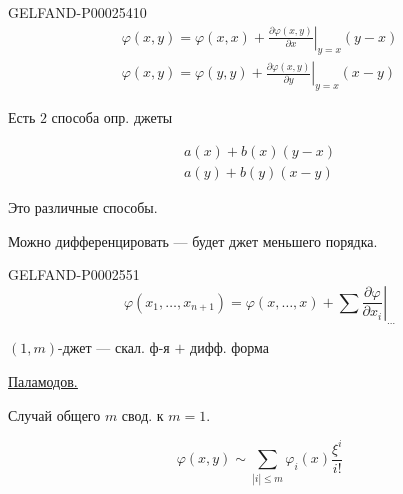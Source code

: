 \begin{GelfandAdjacentEvidence}{GELFAND-P000254}{10}
\begin{gather*}
\varphi(x,y)=\varphi(x,x)+\left.\frac{\partial\varphi(x,y)}{\partial x}\right|_{y=x}(y-x)
\\
\varphi(x,y)=\varphi(y,y)+\left.\frac{\partial\varphi(x,y)}{\partial y}\right|_{y=x}(x-y)
\end{gather*}

\end{GelfandAdjacentEvidence}


Есть $2$ способа опр. джеты

\begin{gather*}
a(x)+b(x)(y-x)
\\
a(y)+b(y)(x-y)
\end{gather*}

Это различные способы.







Можно дифференцировать — будет джет меньшего порядка.





\begin{GelfandAdjacentEvidence}{GELFAND-P000255}{1}
\begin{equation*}
\varphi(x_1,\ldots,x_{n+1})=\varphi(x,\ldots,x)+\sum\left.\frac{\partial\varphi}{\partial x_i}\right|_{\ldots}
\end{equation*}

\end{GelfandAdjacentEvidence}


$(1,m)$-джет — скал. ф-я $+$ дифф. форма





\underline{\underline{Паламодов.}}

Случай общего $m$ свод. к $m=1$.





\begin{equation*}
\varphi(x,y)\sim\sum_{|i|\le m}\varphi_i(x)\frac{\xi^i}{i!}
\end{equation*}





